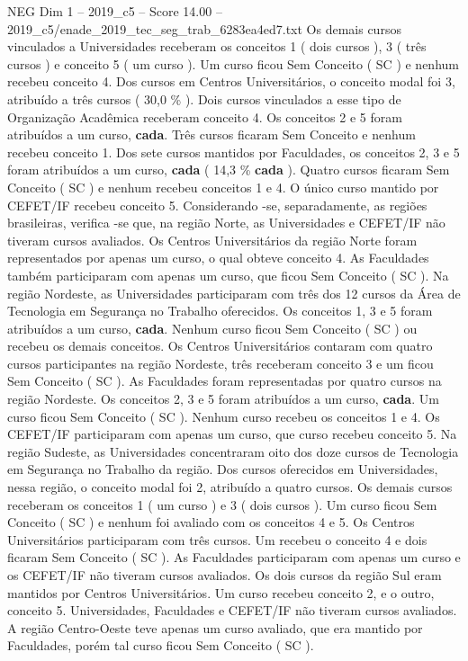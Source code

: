 \begin{textsample}{NEG Dim 1 – 2019\_c5 – Score 14.00 – 2019\_c5/enade\_2019\_tec\_seg\_trab\_6283ea4ed7.txt}
Os demais cursos vinculados a Universidades receberam os conceitos 1 ( dois cursos ), 3 ( três cursos ) e conceito 5 ( um curso ).
Um curso ficou Sem Conceito ( SC ) e nenhum recebeu conceito 4.
Dos cursos em Centros Universitários, o conceito modal foi 3, atribuído a três cursos ( 30,0 \% ).
Dois cursos vinculados a esse tipo de Organização Acadêmica receberam conceito 4.
Os conceitos 2 e 5 foram atribuídos a um curso, \textbf{cada}.
Três cursos ficaram Sem Conceito e nenhum recebeu conceito 1.
Dos sete cursos mantidos por Faculdades, os conceitos 2, 3 e 5 foram atribuídos a um curso, \textbf{cada} ( 14,3 \% \textbf{cada} ).
Quatro cursos ficaram Sem Conceito ( SC ) e nenhum recebeu conceitos 1 e 4.
O único curso mantido por CEFET/IF recebeu conceito 5.
Considerando -se, separadamente, as regiões brasileiras, verifica -se que, na região Norte, as Universidades e CEFET/IF não tiveram cursos avaliados.
Os Centros Universitários da região Norte foram representados por apenas um curso, o qual obteve conceito 4.
As Faculdades também participaram com apenas um curso, que ficou Sem Conceito ( SC ).
Na região Nordeste, as Universidades participaram com três dos 12 cursos da Área de Tecnologia em Segurança no Trabalho oferecidos.
Os conceitos 1, 3 e 5 foram atribuídos a um curso, \textbf{cada}.
Nenhum curso ficou Sem Conceito ( SC ) ou recebeu os demais conceitos.
Os Centros Universitários contaram com quatro cursos participantes na região Nordeste, três receberam conceito 3 e um ficou Sem Conceito ( SC ).
As Faculdades foram representadas por quatro cursos na região Nordeste.
Os conceitos 2, 3 e 5 foram atribuídos a um curso, \textbf{cada}.
Um curso ficou Sem Conceito ( SC ).
Nenhum curso recebeu os conceitos 1 e 4.
Os CEFET/IF participaram com apenas um curso, que curso recebeu conceito 5.
Na região Sudeste, as Universidades concentraram oito dos doze cursos de Tecnologia em Segurança no Trabalho da região.
Dos cursos oferecidos em Universidades, nessa região, o conceito modal foi 2, atribuído a quatro cursos.
Os demais cursos receberam os conceitos 1 ( um curso ) e 3 ( dois cursos ).
Um curso ficou Sem Conceito ( SC ) e nenhum foi avaliado com os conceitos 4 e 5.
Os Centros Universitários participaram com três cursos.
Um recebeu o conceito 4 e dois ficaram Sem Conceito ( SC ).
As Faculdades participaram com apenas um curso e os CEFET/IF não tiveram cursos avaliados.
Os dois cursos da região Sul eram mantidos por Centros Universitários.
Um curso recebeu conceito 2, e o outro, conceito 5.
Universidades, Faculdades e CEFET/IF não tiveram cursos avaliados.
A região Centro-Oeste teve apenas um curso avaliado, que era mantido por Faculdades, porém tal curso ficou Sem Conceito ( SC ).

\end{textsample}
